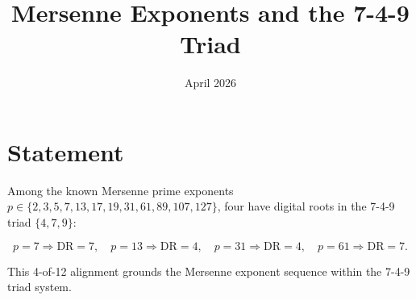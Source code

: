 \documentclass{article}
\title{Mersenne Exponents and the 7-4-9 Triad}
\date{April 2026}
\begin{document}
\maketitle

\section{Statement}

Among the known Mersenne prime exponents $p \in \{2,3,5,7,13,17,19,31,61,89,107,127\}$, four have digital roots in the 7-4-9 triad $\{4,7,9\}$:

\[
p = 7 \Rightarrow \mathrm{DR}=7, \quad
p = 13 \Rightarrow \mathrm{DR}=4, \quad
p = 31 \Rightarrow \mathrm{DR}=4, \quad
p = 61 \Rightarrow \mathrm{DR}=7.
\]

This 4-of-12 alignment grounds the Mersenne exponent sequence within the 7-4-9 triad system.
\end{document}
